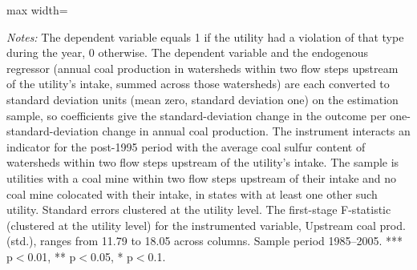 \begin{table}[htbp]
{\begin{adjustbox}{max width=\linewidth}
\begin{tabular}
\bottomrule
\end{tabular}
\end{adjustbox}
}
\begin{minipage}{\linewidth}
\vspace{4pt}
\footnotesize
\raggedright
\textit{Notes:} The dependent variable equals 1 if the utility had a violation of that type during the year, 0 otherwise. The dependent variable and the endogenous regressor (annual coal production in watersheds within two flow steps upstream of the utility's intake, summed across those watersheds) are each converted to standard deviation units (mean zero, standard deviation one) on the estimation sample, so coefficients give the standard-deviation change in the outcome per one-standard-deviation change in annual coal production. The instrument interacts an indicator for the post-1995 period with the average coal sulfur content of watersheds within two flow steps upstream of the utility's intake. The sample is utilities with a coal mine within two flow steps upstream of their intake and no coal mine colocated with their intake, in states with at least one other such utility. Standard errors clustered at the utility level. The first-stage F-statistic (clustered at the utility level) for the instrumented variable, Upstream coal prod. (std.), ranges from 11.79 to 18.05 across columns. Sample period 1985--2005. *** p$<$0.01, ** p$<$0.05, * p$<$0.1.
\end{minipage}
\end{table}
